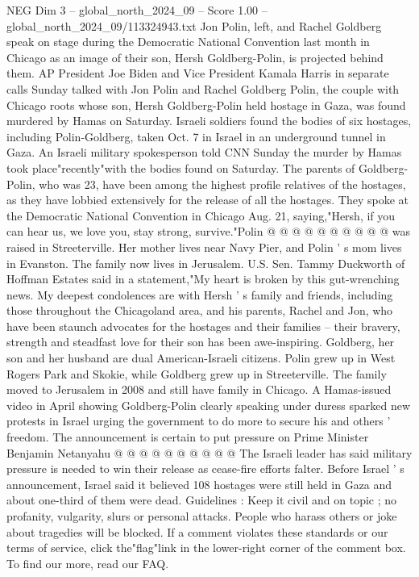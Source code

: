 \begin{textsample}{NEG Dim 3 – global\_north\_2024\_09 – Score 1.00 – global\_north\_2024\_09/113324943.txt}  \label{ex:f3_neg_298}
Jon Polin, left, and Rachel Goldberg speak on stage during the Democratic National Convention last month in Chicago as an image of their son, Hersh Goldberg-Polin, is projected behind them.
AP President Joe Biden and Vice President Kamala Harris in separate calls Sunday talked with Jon Polin and Rachel Goldberg Polin, the couple with Chicago roots whose son, Hersh Goldberg-Polin held hostage in Gaza, was found murdered by Hamas on Saturday.
Israeli soldiers found the bodies of six hostages, including Polin-Goldberg, taken Oct. 7 in Israel in an underground tunnel in Gaza.
An Israeli military spokesperson told CNN Sunday the murder by Hamas took place"recently"with the bodies found on Saturday.
The parents of Goldberg-Polin, who was 23, have been among the highest profile relatives of the hostages, as they have lobbied extensively for the release of all the hostages.
They spoke at the Democratic National Convention in Chicago Aug. 21, saying,"Hersh, if you can hear us, we love you, stay strong, survive."Polin @ @ @ @ @ @ @ @ @ @ was raised in Streeterville.
Her mother lives near Navy Pier, and Polin ' s mom lives in Evanston.
The family now lives in Jerusalem.
U.S.
Sen.
Tammy Duckworth of Hoffman Estates said in a statement,"My heart is broken by this gut-wrenching news.
My deepest condolences are with Hersh ' s family and friends, including those throughout the Chicagoland area, and his parents, Rachel and Jon, who have been staunch advocates for the hostages and their families -- their bravery, strength and steadfast love for their son has been awe-inspiring.
Goldberg, her son and her husband are dual American-Israeli citizens.
Polin grew up in West Rogers Park and Skokie, while Goldberg grew up in Streeterville.
The family moved to Jerusalem in 2008 and still have family in Chicago.
A Hamas-issued video in April showing Goldberg-Polin clearly speaking under duress sparked new protests in Israel urging the government to do more to secure his and others ' freedom.
The announcement is certain to put pressure on Prime Minister Benjamin Netanyahu @ @ @ @ @ @ @ @ @ @ The Israeli leader has said military pressure is needed to win their release as cease-fire efforts falter.
Before Israel ' s announcement, Israel said it believed 108 hostages were still held in Gaza and about one-third of them were dead.
Guidelines : Keep it civil and on topic ; no profanity, vulgarity, slurs or personal attacks.
People who harass others or joke about tragedies will be blocked.
If a comment violates these standards or our terms of service, click the"flag"link in the lower-right corner of the comment box.
To find our more, read our FAQ.

\end{textsample}
